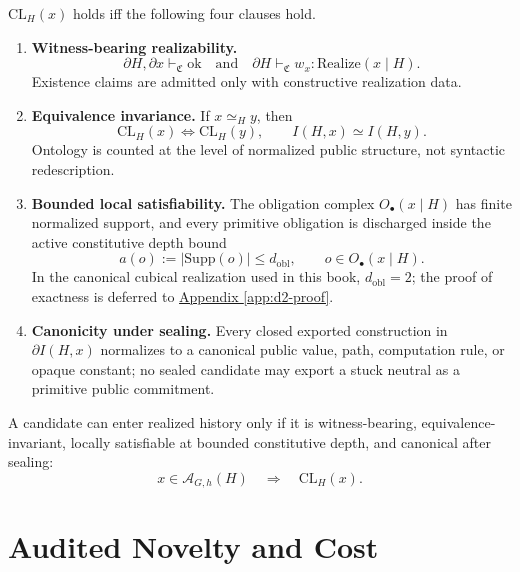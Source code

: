 \begin{definition}
\(\mathrm{CL}_H(x)\) holds iff the following four clauses hold.
\begin{enumerate}[leftmargin=*, label=\textbf{CL\arabic*.}]
\item \textbf{Witness-bearing realizability.}
\[
\partial H,\partial x \vdash_{\mathfrak{C}} \mathrm{ok}
\quad\text{and}\quad
\partial H \vdash_{\mathfrak{C}} w_x : \mathrm{Realize}(x\mid H).
\]
Existence claims are admitted only with constructive realization data.

\item \textbf{Equivalence invariance.} If \(x\simeq_H y\), then
\[
\mathrm{CL}_H(x)\Longleftrightarrow \mathrm{CL}_H(y),
\qquad
I(H,x)\simeq I(H,y).
\]
Ontology is counted at the level of normalized public structure, not syntactic
redescription.

\item \textbf{Bounded local satisfiability.} The obligation complex
\(O_\bullet(x\mid H)\) has finite normalized support, and every primitive
obligation is discharged inside the active constitutive depth bound
\[
a(o) := |\mathrm{Supp}(o)| \le d_{\mathrm{obl}},
\qquad o\in O_\bullet(x\mid H).
\]
In the canonical cubical realization used in this book,
\(d_{\mathrm{obl}}=2\); the proof of exactness is deferred to
\hyperref[app:d2-proof]{Appendix \ref*{app:d2-proof}}.

\item \textbf{Canonicity under sealing.} Every closed exported construction in
\(\partial I(H,x)\) normalizes to a canonical public value, path, computation
rule, or opaque constant; no sealed candidate may export a stuck neutral as a
primitive public commitment.
\end{enumerate}
\end{definition}

\begin{theorem}
A candidate can enter realized history only if it is witness-bearing,
equivalence-invariant, locally satisfiable at bounded constitutive depth, and
canonical after sealing:
\[
x\in\mathcal{A}_{G,h}(H)\quad\Rightarrow\quad \mathrm{CL}_H(x).
\]
\end{theorem}

\section{Audited Novelty and Cost}

